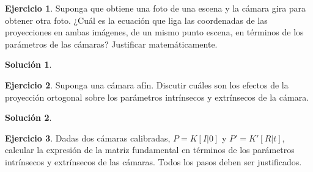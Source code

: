 \documentclass[a4paper, 11pt]{article}
\theoremstyle{definition}
\newtheorem{ejercicio}{Ejercicio}
\newtheorem*{solucion}{Solución}
\theoremstyle{theorem}
\begin{document}
    \begin{ejercicio}
        Suponga que obtiene una foto de una escena y la cámara gira para obtener otra foto. ¿Cuál es la ecuación que liga las coordenadas de las proyecciones en ambas imágenes, de un mismo punto escena, en términos de los parámetros de las cámaras? Justificar matemáticamente.
    \end{ejercicio}

    \begin{solucion}

    \end{solucion}

    \begin{ejercicio}
        Suponga una cámara afín. Discutir cuáles son los efectos de la proyección ortogonal sobre los parámetros intrínsecos y extrínsecos de la cámara.
    \end{ejercicio}

    \begin{solucion}

    \end{solucion}

    \begin{ejercicio}
        Dadas dos cámaras calibradas, $P=K[I|0]$ y $P'=K'[R|t]$, calcular la expresión de la matriz fundamental en términos de los parámetros intrínsecos y extrínsecos de las cámaras. Todos los pasos deben ser justificados.
    \end{ejercicio}
\end{document}
